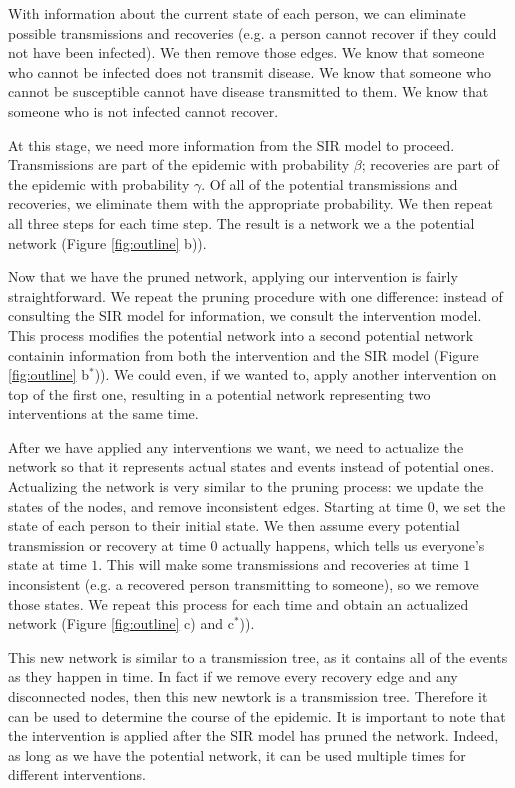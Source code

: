 \documentclass[PTRSB]{rsos}
\begin{document}
\begin{multicols}{2}
With information about the current state of each person, we can eliminate possible transmissions and recoveries (e.g. a person cannot recover if they could not have been infected).
We then remove those edges.
We know that someone who cannot be infected does not transmit disease.
We know that someone who cannot be susceptible cannot have disease transmitted to them.
We know that someone who is not infected cannot recover.

At this stage, we need more information from the SIR model to proceed.
Transmissions are part of the epidemic with probability $\beta$; recoveries are part of the epidemic with probability $\gamma$.
Of all of the potential transmissions and recoveries, we eliminate them with the appropriate probability.
We then repeat all three steps for each time step.
The result is a network we a the potential network (Figure \ref{fig:outline} b)).

Now that we have the pruned network, applying our intervention is fairly straightforward.
We repeat the pruning procedure with one difference: instead of consulting the SIR model for information, we consult the intervention model.
This process modifies the potential network into a second potential network containin information from both the intervention and the SIR model (Figure \ref{fig:outline} b${}^*$)).
We could even, if we wanted to, apply another intervention on top of the first one, resulting in a potential network representing two interventions at the same time.

After we have applied any interventions we want, we need to actualize the network so that it represents actual states and events instead of potential ones.
Actualizing the network is very similar to the pruning process: we update the states of the nodes, and remove inconsistent edges.
Starting at time $0$, we set the state of each person to their initial state.
We then assume every potential transmission or recovery at time $0$ actually happens, which tells us everyone's state at time $1$.
This will make some transmissions and recoveries at time $1$ inconsistent (e.g. a recovered person transmitting to someone), so we remove those states.
We repeat this process for each time and obtain an actualized network (Figure \ref{fig:outline} c) and c${}^*$)).

This new network is similar to a transmission tree, as it contains all of the events as they happen in time.
In fact if we remove every recovery edge and any disconnected nodes, then this new newtork is a transmission tree.
Therefore it can be used to determine the course of the epidemic.
It is important to note that the intervention is applied after the SIR model has pruned the network.
Indeed, as long as we have the potential network, it can be used multiple times for different interventions.


\end{multicols}
\end{document}

